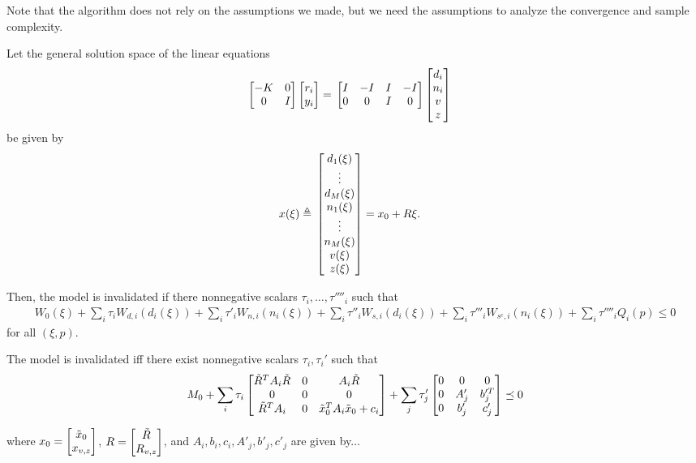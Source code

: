 \documentclass[11pt, onecolumn]{article}
\begin{document}
\begin{remark}
  Note that the algorithm does not rely on the assumptions we made, but we need the assumptions to
  analyze the convergence and sample complexity.
\end{remark}

\begin{theorem}
  Let the general solution space of the linear equations
    \begin{align*}
      \begin{bmatrix}-K & 0\\0&I\end{bmatrix}\begin{bmatrix}r_i\\y_i\end{bmatrix} = &\; \begin{bmatrix}I&-I&I&-I\\0&0&I&0\end{bmatrix}\begin{bmatrix}d_i\\n_i\\v\\z\end{bmatrix}
    \end{align*}
  be given by \\
  \begin{align*}
    x(\xi) \triangleq&\; \begin{bmatrix}d_1(\xi)\\\vdots\\d_M(\xi)\\n_1(\xi)\\\vdots\\n_M(\xi)\\v(\xi)\\z(\xi)\end{bmatrix}= x_0 + R\xi.
  \end{align*}

  Then, the model is invalidated if there nonnegative scalars $\tau_i,\ldots,\tau''''_i$ such that
  \begin{align*}
   W_0(\xi) + \sum_i \tau_i W_{d,i}(d_i(\xi)) + \sum_i \tau'_i W_{n,i}(n_i(\xi)) + \sum_i \tau''_i W_{s,i}(d_i(\xi)) + \sum_i \tau'''_i W_{s^c,i}(n_i(\xi)) + \sum_i \tau''''_i Q_i(p) \leq 0
  \end{align*}
  for all $(\xi,p)$.
\end{theorem}

\begin{corollary}
The model is invalidated iff there exist nonnegative scalars $\tau_i, \tau_i'$ such that
  \begin{align*}
  M_0 + \sum_i \tau_i\begin{bmatrix}\tilde R^T A_i \tilde R &0 & A_i \tilde R\\0 & 0 & 0\\\tilde R^T A_i &0& \tilde x_0^TA_i\tilde x_0 + c_i\end{bmatrix} + \sum_j \tau_j'\begin{bmatrix}0 & 0 & 0 \\ 0 & A_j' & b_j'^T\\0 & b_j' & c_j'\end{bmatrix} \preceq 0
  \end{align*}
\end{corollary}

where $x_0 = \begin{bmatrix}\tilde x_0\\ x_{v,z}\end{bmatrix}$, $R = \begin{bmatrix}\tilde R\\R_{v,z}\end{bmatrix}$, and $A_i,b_i,c_i,A'_j,b'_j,c'_j$ are given by...
\end{document}
